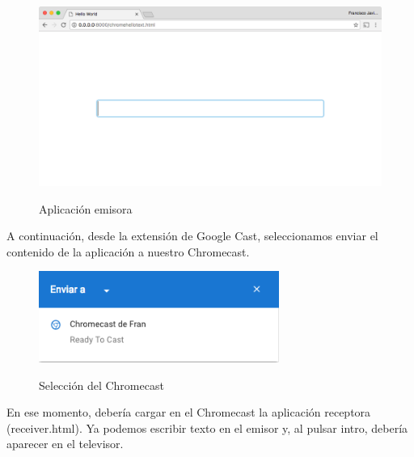 \begin{figure}[H]
	\centering
	\includegraphics[width=1.1\textwidth]{./Imagenes/emisor1.png}
	\label{fig:fondo}
	\caption{Aplicación emisora}
\end{figure}

A continuación, desde la extensión de Google Cast, seleccionamos enviar el contenido de la aplicación a nuestro Chromecast.

\begin{figure}[H]
	\centering
	\includegraphics[width=0.7\textwidth]{./Imagenes/seleccion.png}
	\label{fig:fondo}
	\caption{Selección del Chromecast}
\end{figure}


En ese momento, debería cargar en el Chromecast la aplicación receptora (receiver.html).
Ya podemos escribir texto en el emisor y, al pulsar intro, debería aparecer en el televisor.

